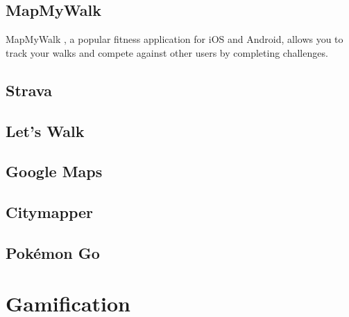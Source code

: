 \subsection{MapMyWalk}

MapMyWalk \cite{Map}, a popular fitness application for iOS and Android, allows you to track your walks and compete against other users by completing challenges.

\subsection{Strava}

\subsection{Let's Walk}

\subsection{Google Maps}

\subsection{Citymapper}

\subsection{Pok\'{e}mon Go}






\section{Gamification}




